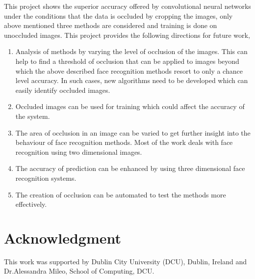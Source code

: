 \documentclass[conference]{IEEEtran}
\begin{document}
This project shows the superior accuracy offered by convolutional neural networks under the conditions that the data is occluded by cropping the images, only above mentioned three methods are considered and training is done on unoccluded images. This project provides the following directions for future work, 
\begin{enumerate}
\item Analysis of methods by varying the level of occlusion of the images. This can help to find a threshold of occlusion that can be applied to images beyond which the above described face recognition methods resort to only a chance level accuracy. In such cases, new algorithms need to be developed which can easily identify occluded images.

\item Occluded images can be used for training which could affect the accuracy of the system.

\item The area of occlusion in an image can be varied to get further insight into the behaviour of face recognition methods. 
Most of the work deals with face recognition using two dimensional images.

\item The accuracy of prediction can be enhanced by using three dimensional face recognition systems.

\item The creation of occlusion can be automated to test the methods more effectively.


\end{enumerate}
 


\section*{Acknowledgment}
This work was supported by Dublin City University (DCU), Dublin, Ireland and Dr.Alessandra Mileo, School of Computing, DCU.



\end{document}
